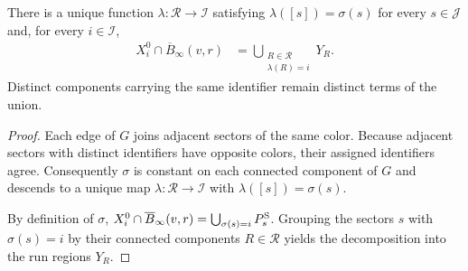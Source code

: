 \begin{lemma}
    \label{thm:area_law_initial_sector_run_assignment}
    \leanok
    There is a unique function $\lambda:\mathcal R\to\mathcal I$
    satisfying $\lambda([s])=\sigma(s)$ for every $s\in\mathcal J$
    and, for every $i\in\mathcal I$,
    \begin{align}
        X_i^0\cap\overline B_\infty(v,r)
         & =\bigcup_{\substack{R\in\mathcal R \\\lambda(R)=i}}Y_R.
    \end{align}
    Distinct components carrying the same identifier remain distinct terms
    of the union.
\end{lemma}
\begin{proof}\leanok
    Each edge of $G$ joins adjacent sectors of the same color.
    Because adjacent sectors with distinct identifiers have opposite colors, their assigned
    identifiers agree. Consequently $\sigma$ is constant on each connected
    component of $G$ and descends to a unique map $\lambda:\mathcal R\to\mathcal I$
    with $\lambda([s])=\sigma(s)$.

    By definition of $\sigma$,
    $X_i^0\cap\overline B_\infty(v,r)=\bigcup_{\sigma(s)=i}P_s^{\rm S}$.
    Grouping the sectors $s$ with $\sigma(s)=i$ by their connected components
    $R\in\mathcal R$ yields the decomposition into the run regions $Y_R$.
\end{proof}

